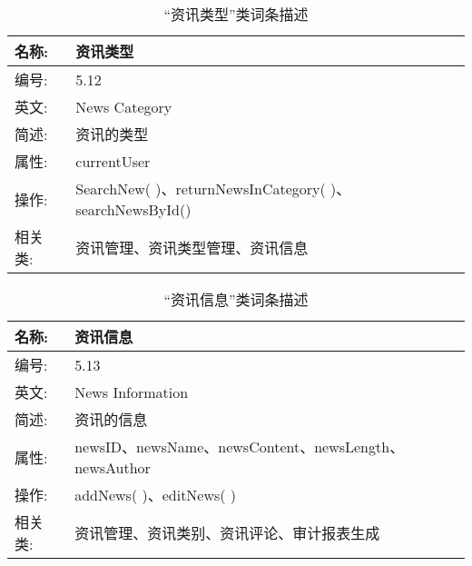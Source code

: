 \begin{table}[H]  
\caption{“资讯类型”类词条描述}  
\begin{center}  
    \begin{tabular}{l p{11cm}} 
        \hline
        \quad 名称:  & 资讯类型 \\
        \hline
        \quad 编号:  & 5.12 \\
        \hline
        \quad 英文:  &  News Category\\
        \hline
        \quad 简述:  & 资讯的类型 \\
        \hline
        \quad 属性:  & currentUser \\
        \hline
        \quad 操作:  & SearchNew( )、returnNewsInCategory( )、searchNewsById()\\
        \hline
        \quad 相关类: & 资讯管理、资讯类型管理、资讯信息\\
        \hline
    \end{tabular}
\end{center}
\end{table}

\begin{table}[H]  
\caption{“资讯信息”类词条描述}  
\begin{center}  
    \begin{tabular}{l p{11cm}} 
        \hline
        \quad 名称:  & 资讯信息 \\
        \hline
        \quad 编号:  & 5.13 \\
        \hline
        \quad 英文:  &  News Information\\
        \hline
        \quad 简述:  & 资讯的信息 \\
        \hline
        \quad 属性:  & newsID、newsName、newsContent、newsLength、newsAuthor \\
        \hline
        \quad 操作:  & addNews( )、editNews( )\\
        \hline
        \quad 相关类: & 资讯管理、资讯类别、资讯评论、审计报表生成\\
        \hline
    \end{tabular}
\end{center}
\end{table}

